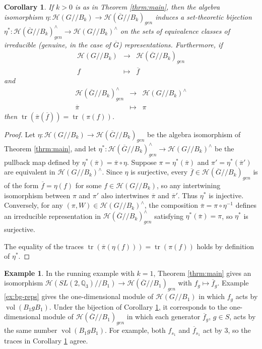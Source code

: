 \documentclass[12pt,letterpaper,reqno]{amsart}
\let\cal\mathcal
\newtheorem{corollary}[theorem]{Corollary}
\theoremstyle{definition}
\newtheorem{example}[theorem]{Example}
\theoremstyle{remark}
\numberwithin{equation}{section}
\begin{document}
\begin{corollary}
\label{corollary:main}
If $k>0$ is as in Theorem \ref{thrm:main}, then the algebra isomorphism
$\eta:{\cal H}(G//B_k)\rightarrow {\cal H}(\overline{G}//B_k)_{gen}$ induces a
set-theoretic bijection
$\eta^*:{\cal H}(\overline{G}//B_k)_{gen}^\wedge
\rightarrow {\cal H}(G//B_k)^\wedge$ on the sets of equivalence classes of
irreducible (genuine, in the case of $\overline{G}$) representations.
Furthermore, if
\[
\begin{array}{ccc}
{\cal H}(G//B_k)&\longrightarrow &{\cal H}(\overline{G}//B_k)_{gen}\\
f & \longmapsto &\overline{f}
\end{array}
\]
and
\[
\begin{array}{ccc}
{\cal H}(\overline{G}//B_k)_{gen}^\wedge
  &\longrightarrow &{\cal H}(G//B_k)^\wedge\\
\overline{\pi}&\longmapsto &\pi
\end{array}
\]
then $\operatorname{tr}(\overline{\pi}(\overline{f}))=\operatorname{tr}(\pi(f))$.
\end{corollary}

\begin{proof}
Let $\eta:{\cal H}(G//B_k)\rightarrow {\cal H}(\overline{G}//B_k)_{gen}$ be
the algebra isomorphism of Theorem \ref{thrm:main}, and let
$\eta^*:{\cal H}(\overline{G}//B_k)_{gen}^\wedge
\rightarrow {\cal H}(G//B_k)^\wedge$ be the pullback map defined by
$\eta^*(\overline{\pi})=\overline{\pi}\circ \eta$. Suppose
$\pi=\eta^*(\overline{\pi})$ and $\pi'=\eta^*(\overline{\pi}')$ are equivalent
in ${\cal H}(G//B_k)^\wedge$. Since $\eta$ is surjective, every
$\overline{f}\in {\cal H}(\overline{G}//B_k)_{gen}$ is of the form
$\overline{f}=\eta(f)$ for some $f\in {\cal H}(G//B_k)$, so any intertwining
isomorphism between $\pi$ and $\pi'$ also intertwines $\overline{\pi}$ and
$\overline{\pi}'$. Thus $\eta^*$ is injective. Conversely, for any
$(\pi,W)\in {\cal H}(G//B_k)^\wedge$, the composition
$\overline{\pi}=\pi\circ \eta^{-1}$ defines an irreducible representation in
${\cal H}(\overline{G}//B_k)_{gen}^\wedge$ satisfying
$\eta^*(\overline{\pi})=\pi$, so $\eta^*$ is surjective.

The equality of the traces $\operatorname{tr}(\overline{\pi}(\eta(f)))
=\operatorname{tr}(\pi(f))$ holds by definition of $\eta^*$.
\end{proof}

\begin{example}
\label{ex:main}
In the running example with $k=1$, Theorem \ref{thrm:main} gives an
isomorphism ${\cal H}(SL(2,\mathbb{Q}_3)//B_1)\rightarrow
{\cal H}(\overline{G}//B_1)_{gen}$ with $f_g\mapsto\overline{f}_g$. Example
\ref{ex:bg-reps} gives the one-dimensional module of ${\cal H}(G//B_1)$ in
which $f_g$ acts by $\operatorname{vol}(B_1gB_1)$. Under the bijection of
Corollary \ref{corollary:main}, it corresponds to the one-dimensional module
of ${\cal H}(\overline{G}//B_1)_{gen}$ in which each generator
$\overline{f}_g$, $g\in S$, acts by the same number
$\operatorname{vol}(B_1gB_1)$. For example, both $f_{s_1}$ and
$\overline{f}_{s_1}$ act by $3$, so the traces in Corollary
\ref{corollary:main} agree.
\end{example}
\end{document}
